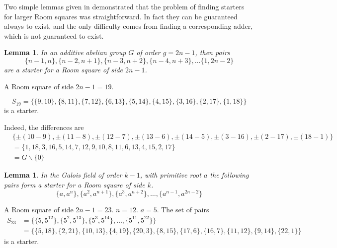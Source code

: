 \documentclass[
  11pt,
  a4paper]{book}\usepackage[]{graphicx}\usepackage[]{xcolor}
\newtheorem{lemma}[theorem]{Lemma}
\newcounter{example}
\begin{document}
Two simple lemmas given in
\cite{stantonConstructionRoomSquares1968}
demonstrated that the problem of finding starters for larger
Room squares was straightforward. In fact they can be
guaranteed always to exist, and the only difficulty comes
from finding a corresponding adder, which is not guaranteed
to exist.

\begin{lemma}
In an additive abelian group $G$ of order $g = 2n-1$,
then pairs
\begin{equation*}
  \{n - 1, n\}, \{n - 2, n + 1\}, \{n - 3, n + 2\}, \{n - 4, n + 3\}, \ldots\{1, 2n - 2\}
\end{equation*}
are a starter for a Room square of side $2n - 1$.
\end{lemma}

\begin{example}
A Room square of side $2n - 1 = 19$.

\begin{equation*}
S_{19} = \{\{9, 10\}, \{8, 11\}, \{7, 12\}, \{6, 13\}, \{5, 14\}, \{4, 15\}, \{3, 16\}, \{2, 17\}, \{1, 18\}\}
\end{equation*}
is a starter.

Indeed, the differences are
\begin{equation*}
\begin{split}
  & \{\pm(10 - 9), \pm(11 - 8), \pm(12 - 7), \pm(13 - 6), \pm(14 - 5), \pm(3 - 16), \pm(2 - 17), \pm(18 - 1)\} \\ 
  &= \{1, 18, 3, 16, 5, 14, 7, 12, 9, 10, 8, 11, 6, 13, 4, 15, 2, 17\} \\
  &= G \backslash \{0\}
\end{split}
\end{equation*}
\end{example}

\begin{lemma}
In the Galois field of order $k - 1$, with primitive root
$a$ the following pairs form a starter for a Room square of
side $k$.
\begin{equation}
  \{a, a^n\}, \{a^2, a^{n + 1}\}, \{a^3, a^{n + 2}\}, \ldots, \{a^{n - 1}, a^{2n - 2}\}
\end{equation}
\end{lemma}

\begin{example}
A Room square of side $2n - 1 = 23$. $n = 12$. $a = 5$.
The set of pairs
\begin{equation*}
\begin{split}
S_{23} &= \{\{5, 5^{12}\}, \{5^2, 5^{13}\}, \{5^3, 5^{14}\}, \ldots, \{5^{11}, 5^{22}\}\} \\
       &= \{\{5, 18\}, \{2, 21\}, \{10, 13\}, \{4, 19\}, \{20, 3\}, \{8, 15\}, \{17, 6\}, \{16, 7\}, \{11, 12\}, \{9, 14\}, \{22, 1\}\}
\end{split}
\end{equation*}
is a starter.
\end{example}
\end{document}
